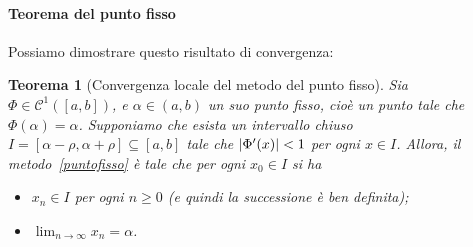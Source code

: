 \documentclass[a4paper]{report}
\DeclarePairedDelimiter{\abs}{\lvert}{\rvert}
\newtheorem{theorem}{Teorema}[chapter]
\theoremstyle{definiton}
\theoremstyle{remark}
\begin{document}


\paragraph{Teorema del punto fisso} Possiamo dimostrare questo risultato di convergenza:
\begin{theorem}[Convergenza locale del metodo del punto fisso] \label{thm:puntofisso}
Sia $\Phi \in \mathcal{C}^1([a,b])$, e $\alpha \in (a,b)$ un suo \emph{punto fisso}, cioè un punto tale che $\Phi(\alpha) = \alpha$. Supponiamo che esista un intervallo chiuso $I = [\alpha-\rho, \alpha+\rho] \subseteq [a,b]$ tale che $\abs{\Phi'(x)} < 1$ per ogni $x \in I$. Allora, il metodo~\eqref{puntofisso} è tale che per ogni $x_0 \in I$ si ha
\begin{itemize}
    \item $x_n \in I$ per ogni $n \geq 0$ (e quindi la successione è ben definita);
    \item $\lim_{n\to\infty} x_n = \alpha$.
\end{itemize}
\end{theorem}
\end{document}
